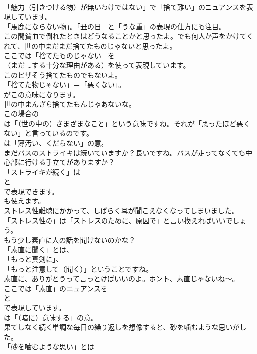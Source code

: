 \documentclass[8pt]{extreport}
\begin{document}
\begin{CJK}{UTF8}{min}
\\	「魅力（引きつける物）が無いわけではない」で「捨て難い」のニュアンスを表現しています。
\\	「馬鹿にならない物」。「丑の日」と「うな重」の表現の仕方にも注目。	
\\	この間貧血で倒れたときはどうなることかと思ったよ。でも何人か声をかけてくれて、世の中まだまだ捨てたものじゃないと思ったよ。 
\\	ここでは「捨てたものじゃない」を 
\\	（まだ …する十分な理由がある）を使って表現しています。	
\\	このピザそう捨てたものでもないよ。 
\\	「捨てた物じゃない」＝「悪くない」。
\\	がこの意味になります。	
\\	世の中まんざら捨てたもんじゃあないな。 
\\	この場合の
\\	は「（世の中の）さまざまなこと」という意味ですね。それが「思ったほど悪くない」と言っているのです。
\\	は「薄汚い、くだらない」の意。	
\\	まだバスのストライキは続いていますか？長いですね。バスが走ってなくても中心部に行ける手立てがありますか？ 
\\	「ストライキが続く」は 
\\	と 
\\	で表現できます。
\\	も使えます。	
\\	ストレス性難聴にかかって、しばらく耳が聞こえなくなってしまいました。 
\\	「ストレス性の」は「ストレスのために、原因で」と言い換えればいいでしょう。	
\\	もう少し素直に人の話を聞けないのかな？ 
\\	「素直に聞く」とは、
\\	「もっと真剣に」、
\\	「もっと注意して（聞く）」ということですね。	
\\	素直に、ありがとうって言っとけばいいのよ。ホント、素直じゃないね～。 
\\	ここでは「素直」のニュアンスを 
\\	と 
\\	で表現しています。
\\	は「（暗に）意味する」の意。	
\\	果てしなく続く単調な毎日の繰り返しを想像すると、砂を噛むような思いがした。 
\\	「砂を噛むような思い」とは 

\end{CJK}
\end{document}
